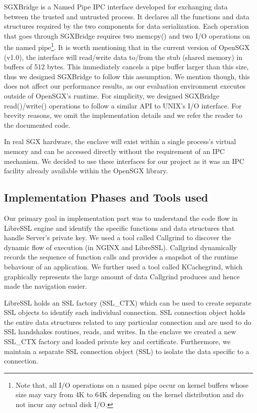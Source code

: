 \documentclass[../main.tex]{subfiles}
\begin{document}
SGXBridge is a Named Pipe IPC interface developed for exchanging data between
the trusted and untrusted process. It declares all the functions and data
structures required by the two components for data serialization. Each operation
that goes through SGXBridge requires two memcpy() and two I/O operations on the
named pipe\footnote{Note that, all I/O operations on a named pipe occur on
kernel buffers whose size may vary from 4K to 64K depending on the kernel
distribution and do not incur any actual disk I/O.}. It is worth mentioning
that in the current version of OpenSGX (v1.0), the interface will read/write
data to/from the stub (shared memory) in buffers of 512 bytes. This immediately
cancels a pipe buffer larger than this size, thus we designed SGXBridge to
follow this assumption. We mention though, this does not affect our performance
results, as our evaluation environment executes outside of OpenSGX's
runtime. For simplicity, we designed SGXBridge read()/write() operations to
follow a similar API to UNIX's I/O interface. For brevity reasons, we omit the
implementation details and we refer the reader to the documented code.

In real SGX hardware, the enclave will exist within a single process's virtual
memory and can be accessed directly without the requirement of an IPC
mechanism. We decided to use these interfaces for our project as it was an IPC
facility already available within the OpenSGX library.

\subsection{Implementation Phases and Tools used}
Our primary goal in implementation part was to understand the code flow in LibreSSL
engine and identify the specific functions and data structures that handle Server’s 
private key. We used a tool called Callgrind to discover the dynamic flow of execution 
(in NGINX and LibreSSL). Callgrind dynamically records the sequence of function calls 
and provides a snapshot of the runtime behaviour of an application. We further used a
tool called KCachegrind, which graphically represents the large amount of data 
Callgrind produces and hence made the navigation easier.
 
LibreSSL holds an SSL factory (SSL\_CTX) which can be used to create separate SSL objects
to identify each individual connection. SSL connection object holds the entire 
data structures related to any particular connection and are used to do SSL handshakes
routines, reads, and writes. In the enclave we created a new SSL\_CTX factory and loaded
private key and certificate. Furthermore, we maintain a separate SSL connection object (SSL)
to isolate the data specific to a connection.   
 
\end{document}
